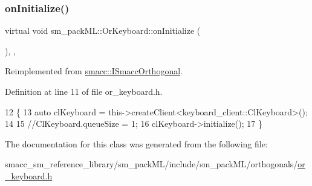 \subsubsection{\texorpdfstring{on\+Initialize()}{onInitialize()}}
{\footnotesize\ttfamily virtual void sm\+\_\+pack\+M\+L\+::\+Or\+Keyboard\+::on\+Initialize (\begin{DoxyParamCaption}{ }\end{DoxyParamCaption})\hspace{0.3cm}{\ttfamily [inline]}, {\ttfamily [override]}, {\ttfamily [virtual]}}



Reimplemented from \hyperlink{classsmacc_1_1ISmaccOrthogonal_a6bb31c620cb64dd7b8417f8705c79c7a}{smacc\+::\+I\+Smacc\+Orthogonal}.



Definition at line 11 of file or\+\_\+keyboard.\+h.


\begin{DoxyCode}
12     \{
13         \textcolor{keyword}{auto} clKeyboard = this->createClient<keyboard\_client::ClKeyboard>();
14         
15         \textcolor{comment}{//ClKeyboard.queueSize = 1;}
16         clKeyboard->initialize();
17     \}
\end{DoxyCode}


The documentation for this class was generated from the following file\+:\begin{DoxyCompactItemize}
\item 
smacc\+\_\+sm\+\_\+reference\+\_\+library/sm\+\_\+pack\+M\+L/include/sm\+\_\+pack\+M\+L/orthogonals/\hyperlink{sm__packML_2include_2sm__packML_2orthogonals_2or__keyboard_8h}{or\+\_\+keyboard.\+h}\end{DoxyCompactItemize}
